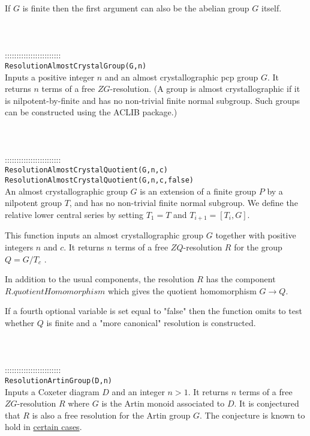 \documentclass[a4paper,11pt]{report}
\begin{document}
{ If $G$ is finite then the first argument can also be the abelian group $G$ itself. \\
 \\
 \\
 \\
 ::::::::::::::::::::::::\\
 \texttt{ResolutionAlmostCrystalGroup(G,n)}\\
 

 Inputs a positive integer $n$ and an almost crystallographic pcp group $G$. It returns $n$ terms of a free $ZG$-resolution. (A group is almost crystallographic if it is nilpotent-by-finite
and has no non-trivial finite normal subgroup. Such groups can be constructed
using the ACLIB package.) \\
 \\
 \\
 \\
 ::::::::::::::::::::::::\\
 \texttt{ResolutionAlmostCrystalQuotient(G,n,c)}\\
 \texttt{ResolutionAlmostCrystalQuotient(G,n,c,false)}\\
 

 An almost crystallographic group $G$ is an extension of a finite group $P$ by a nilpotent group $T$, and has no non-trivial finite normal subgroup. We define the relative lower
central series by setting $T_1=T$ and $T_{i+1}=[T_i,G]$.

 This function inputs an almost crystallographic group $G$ together with positive integers $n$ and $c$. It returns $n$ terms of a free $ZQ$-resolution $R$ for the group $Q=G/T_c$ .

 In addition to the usual components, the resolution $R$ has the component $R.quotientHomomorphism$ which gives the quotient homomorphism $G \longrightarrow Q $.

 If a fourth optional variable is set equal to "false" then the function omits
to test whether $Q$ is finite and a "more canonical" resolution is constructed. \\
 \\
 \\
 \\
 ::::::::::::::::::::::::\\
 \texttt{ResolutionArtinGroup(D,n)}\\
 

 Inputs a Coxeter diagram $D$ and an integer $n>1$. It returns $n$ terms of a free $ZG$-resolution $R$ where $G$ is the Artin monoid associated to $D$. It is conjectured that $R$ is also a free resolution for the Artin group $G$. The conjecture is known to hold in \href{../www/SideLinks/About/aboutArtinGroups.html} {certain cases}.

}
\end{document}
